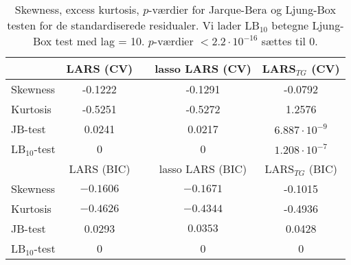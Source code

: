 \begin{table}
\center
\begin{tabular}{lcccc} 
\toprule
& LARS (CV) && lasso LARS  (CV) & LARS$_{TG}$ (CV) \\ \midrule
Skewness & -0.1222 && -0.1291 & -0.0792   \\
Kurtosis & -0.5251  && -0.5272 & 1.2576 \\
JB-test & 0.0241 &&  0.0217 & $6.887\cdot 10^{-9}$ \\
LB$_{10}$-test &0 && 0  & $1.208 \cdot 10^{-7}$  \\  \bottomrule \toprule
& LARS (BIC) && lasso LARS (BIC) &  LARS$_{TG}$ (BIC) \\ \midrule
Skewness & $-0.1606$  && $-0.1671$   & -0.1015 \\
Kurtosis &   $-0.4626$ && $-0.4344 $ & -0.4936  \\
JB-test & 0.0293 &&  $0.0353$ &  0.0428\\
LB$_{10}$-test & 0 && 0  & 0\\  \bottomrule 
\end{tabular}
\caption{Skewness, excess kurtosis, $p$-værdier for Jarque-Bera og Ljung-Box testen for de standardiserede residualer. Vi lader LB$_{10}$ betegne Ljung-Box test med lag = 10. 
\(p\)-værdier \(< 2.2 \cdot 10^{-16}\) sættes til 0.} \label{tab:lars_kryds_res_tab}
\end{table}